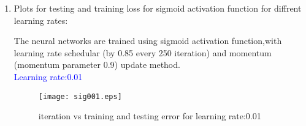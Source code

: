 \documentclass[12pt,a4paper]{article}
\newenvironment{QandA}{\begin{enumerate}[label=\bfseries\alph*.]\bfseries}
                      {\end{enumerate}}
\newenvironment{answered}{\par\normalfont}{}
\begin{document}
\begin{QandA}
\begin{answered}
         \textcolor{blue}{Gradient of  $W_{h3}$:\\ }
		\begin{equation}
		\textcolor{magenta}{dW_{h3}=O_{3}^{T}\delta_o}\text{;where .} dW_{h3} \in \mathbb{R}^{250*10}, O_{3} \in \mathbb{R}^{1*250}
		\end{equation}		         
         $dW_{h3}$ is gradient of $W_{h3}$ and  $O_{3}$  is output of hidden layer h3.\\
         \textcolor{blue}{Gradient of  $W_{h2}$:\\ }
		\begin{equation}
		\textcolor{magenta}{dW_{h2}=O_{2}^{T}\delta_3}\text{;where .} dW_{h2} \in \mathbb{R}^{500*250}, O_{2} \in \mathbb{R}^{1*500}
		\end{equation}		         
         $dW_{h2}$ is gradient of $W_{h2}$ and  $O_{2}$  is output of hidden layer h2.\\
         yer h3.\\
         \textcolor{blue}{Gradient of  $W_{h1}$:\\ }
		\begin{equation}
		\textcolor{magenta}{W_{h1}=O_{1}^{T}\delta_2}\text{;where .} dW_{h1} \in \mathbb{R}^{1000*500}, O_{1} \in \mathbb{R}^{1*1000}
		\end{equation}		         
         $dW_{h1}$ is gradient of $W_{h1}$ and  $O_{1}$  is output of hidden layer h1.\\
         yer h3.\\
         \textcolor{blue}{Gradient of  $W_{in}$:\\ }
		\begin{equation}
		\textcolor{magenta}{dW_{in}=X^{T}\delta_1}\text{;where .} dW_{in} \in \mathbb{R}^{784*1000}, X \in \mathbb{R}^{1*784}
		\end{equation}		         
         $dW_{in}$ is gradient of $W_{in}$ which is weight matrix between input layer and h1 . $X$  is input vectors.\\
         \end{answered}

   \item Plots for testing and training loss for sigmoid activation function for diffrent learning rates:
   
         \begin{answered}
         The neural networks are trained using sigmoid activation function,with learning rate schedular (by 0.85 every 250 iteration) and momentum (momentum parameter 0.9) update method. \\                    
         \textcolor{blue}{Learning rate:0.01\\}
         \begin{figure}[h!]
	       \begin{center}
		     \texttt{[image: sig001.eps]}
		       \caption{iteration vs training and testing error for learning rate:0.01}
		       \label{fig:snr20fft}
	       \end{center}
		

\end{figure}
\end{answered}
\end{QandA}
\end{document}
